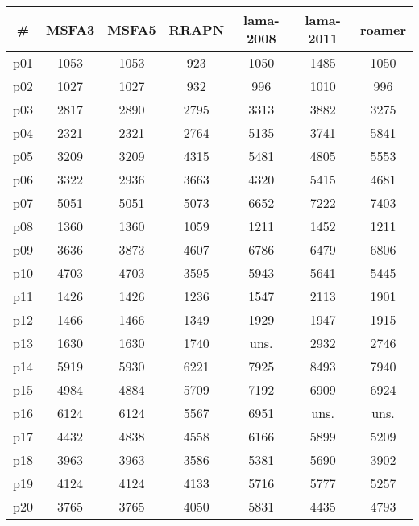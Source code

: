 \begin{tabular}{ccccccc}
\toprule
\textbf{\#} & \textbf{MSFA3} & \textbf{MSFA5} & \textbf{RRAPN} & \textbf{lama-2008} & \textbf{lama-2011} & \textbf{roamer}\\
\midrule
p01 & 1053 & 1053 & 923 & 1050 & 1485 & 1050\\
p02 & 1027 & 1027 & 932 & 996 & 1010 & 996\\
p03 & 2817 & 2890 & 2795 & 3313 & 3882 & 3275\\
p04 & 2321 & 2321 & 2764 & 5135 & 3741 & 5841\\
p05 & 3209 & 3209 & 4315 & 5481 & 4805 & 5553\\
p06 & 3322 & 2936 & 3663 & 4320 & 5415 & 4681\\
p07 & 5051 & 5051 & 5073 & 6652 & 7222 & 7403\\
p08 & 1360 & 1360 & 1059 & 1211 & 1452 & 1211\\
p09 & 3636 & 3873 & 4607 & 6786 & 6479 & 6806\\
p10 & 4703 & 4703 & 3595 & 5943 & 5641 & 5445\\
p11 & 1426 & 1426 & 1236 & 1547 & 2113 & 1901\\
p12 & 1466 & 1466 & 1349 & 1929 & 1947 & 1915\\
p13 & 1630 & 1630 & 1740 & uns. & 2932 & 2746\\
p14 & 5919 & 5930 & 6221 & 7925 & 8493 & 7940\\
p15 & 4984 & 4884 & 5709 & 7192 & 6909 & 6924\\
p16 & 6124 & 6124 & 5567 & 6951 & uns. & uns.\\
p17 & 4432 & 4838 & 4558 & 6166 & 5899 & 5209\\
p18 & 3963 & 3963 & 3586 & 5381 & 5690 & 3902\\
p19 & 4124 & 4124 & 4133 & 5716 & 5777 & 5257\\
p20 & 3765 & 3765 & 4050 & 5831 & 4435 & 4793\\
\bottomrule
\end{tabular}

